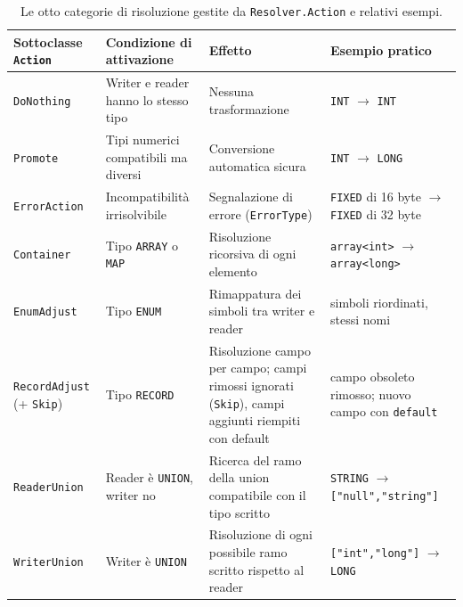 

\begin{table}[h]
\centering
\footnotesize
\begin{tabular}{@{}p{2.2cm}p{3.6cm}p{4.3cm}p{4.3cm}@{}}
\toprule
\textbf{Sottoclasse \texttt{Action}} & \textbf{Condizione di attivazione} & \textbf{Effetto} & \textbf{Esempio pratico} \\
\midrule
\texttt{DoNothing} & Writer e reader hanno lo stesso tipo & Nessuna trasformazione & \texttt{INT} $\to$ \texttt{INT} \\
\addlinespace
\texttt{Promote} & Tipi numerici compatibili ma diversi & Conversione automatica sicura & \texttt{INT} $\to$ \texttt{LONG} \\
\addlinespace
\texttt{ErrorAction} & Incompatibilità irrisolvibile & Segnalazione di errore (\texttt{ErrorType}) & \texttt{FIXED} di 16 byte $\to$ \texttt{FIXED} di 32 byte \\
\addlinespace
\texttt{Container} & Tipo \texttt{ARRAY} o \texttt{MAP} & Risoluzione ricorsiva di ogni elemento & \texttt{array<int>} $\to$ \texttt{array<long>} \\
\addlinespace
\texttt{EnumAdjust} & Tipo \texttt{ENUM} & Rimappatura dei simboli tra writer e reader & simboli riordinati, stessi nomi \\
\addlinespace
\texttt{RecordAdjust} (+ \texttt{Skip}) & Tipo \texttt{RECORD} & Risoluzione campo per campo; campi rimossi ignorati (\texttt{Skip}), campi aggiunti riempiti con default & campo obsoleto rimosso; nuovo campo con \texttt{default} \\
\addlinespace
\texttt{ReaderUnion} & Reader è \texttt{UNION}, writer no & Ricerca del ramo della union compatibile con il tipo scritto & \texttt{STRING} $\to$ \texttt{["null","string"]} \\
\addlinespace
\texttt{WriterUnion} & Writer è \texttt{UNION} & Risoluzione di ogni possibile ramo scritto rispetto al reader & \texttt{["int","long"]} $\to$ \texttt{LONG} \\
\bottomrule
\end{tabular}
\caption{Le otto categorie di risoluzione gestite da \texttt{Resolver.Action} e relativi esempi.}
\label{tab:resolver-action-categorie}
\end{table}


